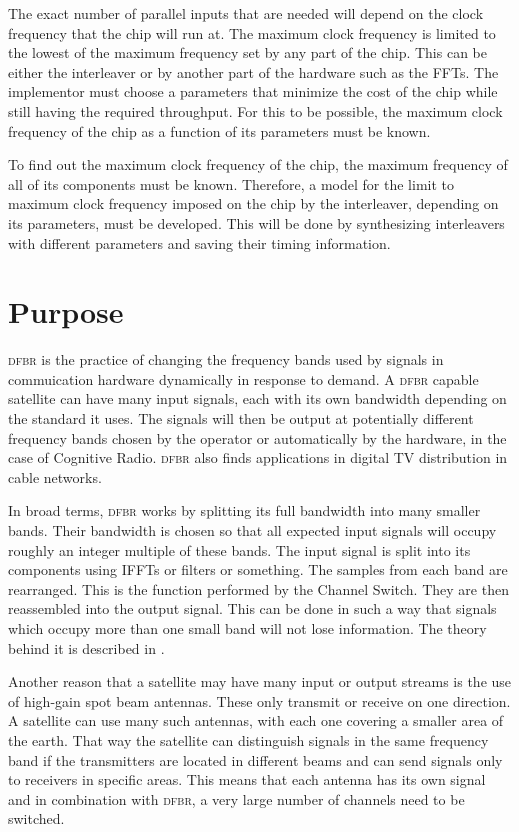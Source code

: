 \documentclass[
	utf8,
	largesmallcaps,
	intlimits,
	widermath,
	sharecounter,
	nobreak,
	definition=marks,
	numbers,
	noparts
]{rtthesis}
\let\textabbr\textsc
\newcommand{\abbrDFBR}{\texorpdfstring{\textabbr{dfbr}}{DFBR}\xspace}
\begin{document}
The exact number of parallel inputs that are needed will depend on the clock
frequency that the chip will run at. The maximum clock frequency is limited to
the lowest of the maximum frequency set by any part of the chip. This can be
either the interleaver or by another part of the hardware such as the FFTs. The
implementor must choose a parameters that minimize the cost of the chip while
still having the required throughput. For this to be possible, the maximum
clock frequency of the chip as a function of its parameters must be known.

To find out the maximum clock frequency of the chip, the maximum frequency of
all of its components must be known. Therefore, a model for the limit to
maximum clock frequency imposed on the chip by the interleaver, depending on
its parameters, must be developed. This will be done by synthesizing
interleavers with different parameters and saving their timing information.

\section{Purpose}

\abbrDFBR is the practice of changing the frequency bands used by signals in
commuication hardware dynamically in response to demand. A \abbrDFBR capable
satellite can have many input signals, each with its own bandwidth depending on
the standard it uses. The signals will then be output at potentially different
frequency bands chosen by the operator or automatically by the hardware, in the
case of Cognitive Radio. \abbrDFBR also finds applications in digital TV
distribution in cable networks.

In broad terms, \abbrDFBR works by splitting its full bandwidth into many
smaller bands. Their bandwidth is chosen so that all expected input signals
will occupy roughly an integer multiple of these bands. The input signal is
split into its components using IFFTs or filters or something. The samples from
each band are rearranged. This is the function performed by the Channel Switch.
They are then reassembled into the output signal. This can be done in such a
way that signals which occupy more than one small band will not lose
information. The theory behind it is described in
\cite{Eghbali:2011:DFR:1960868.1960874}.

Another reason that a satellite may have many input or output streams is the
use of high-gain spot beam antennas. These only transmit or receive on one
direction. A satellite can use many such antennas, with each one covering a
smaller area of the earth. That way the satellite can distinguish signals in
the same frequency band if the transmitters are located in different beams and
can send signals only to receivers in specific areas. This means that each
antenna has its own signal and in combination with \abbrDFBR, a very large
number of channels need to be switched.
\end{document}
